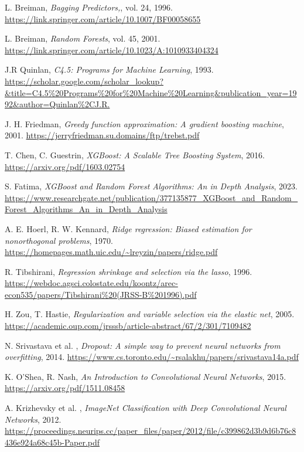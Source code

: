 \documentclass[a4paper,12pt]{report}
\begin{document}
\begin{thebibliography}{99}
		L. Breiman, \emph{Bagging Predictors,}, vol. 24, 1996. \url{https://link.springer.com/article/10.1007/BF00058655}
		
		L. Breiman, \emph{Random Forests}, vol. 45, 2001. \url{https://link.springer.com/article/10.1023/A:1010933404324}
		
		J.R Quinlan, \emph{C4.5: Programs for Machine Learning}, 1993. \url{https://scholar.google.com/scholar_lookup?&title=C4.5%20Programs%20for%20Machine%20Learning&publication_year=1992&author=Quinlan%2CJ.R.}
		
		J. H. Friedman, \emph{Greedy function approximation: A gradient boosting machine}, 2001. \url{https://jerryfriedman.su.domains/ftp/trebst.pdf}
		
		T. Chen, C. Guestrin, \emph{XGBoost: A Scalable Tree Boosting System}, 2016. \url{https://arxiv.org/pdf/1603.02754}
		
		S. Fatima, \emph{XGBoost and Random Forest Algorithms: An in Depth Analysis}, 2023. \url{https://www.researchgate.net/publication/377135877_XGBoost_and_Random_Forest_Algorithms_An_in_Depth_Analysis}
		
		A. E. Hoerl, R. W. Kennard, \emph{Ridge regression: Biased estimation for nonorthogonal problems}, 1970. \url{https://homepages.math.uic.edu/~lreyzin/papers/ridge.pdf}
		
		R. Tibshirani, \emph{Regression shrinkage and selection via the lasso}, 1996. \url{https://webdoc.agsci.colostate.edu/koontz/arec-econ535/papers/Tibshirani%20(JRSS-B%201996).pdf}
		
		H. Zou, T. Hastie, \emph{Regularization and variable selection via the elastic net}, 2005. \url{https://academic.oup.com/jrsssb/article-abstract/67/2/301/7109482}
		
		N. Srivastava et al. , \emph{Dropout: A simple way to prevent neural networks from overfitting}, 2014. \url{https://www.cs.toronto.edu/~rsalakhu/papers/srivastava14a.pdf}
		
		K. O'Shea, R. Nash, \emph{An Introduction to Convolutional Neural Networks}, 2015. \url{https://arxiv.org/pdf/1511.08458}
		
		A. Krizhevsky et al. , \emph{ImageNet Classification with Deep Convolutional Neural Networks}, 2012. \url{https://proceedings.neurips.cc/paper_files/paper/2012/file/c399862d3b9d6b76c8436e924a68c45b-Paper.pdf}
		

\end{thebibliography}
\end{document}
